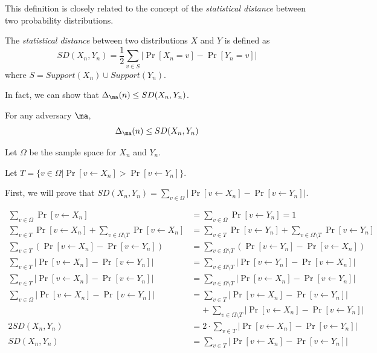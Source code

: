 This definition is closely related to the concept of the \textit{statistical distance} between two probability distributions.
\begin{definition}
The \emph{statistical distance} between two distributions $X$ and $Y$ is defined as
$$SD(X_n, Y_n) = \frac{1}{2}\sum\limits_{v \in S}|\Pr[X_n = v] - \Pr[Y_n = v]|$$
where $S = Support(X_n) \cup Support(Y_n)$.
\end{definition}
In fact, we can show that $\Delta_{\ma}(n) \le SD(X_n, Y_n)$.
\begin{lemma}
    For any adversary $\ma$,
    $$\Delta_{\ma}(n) \le SD(X_n, Y_n)$$
\end{lemma}

\proof
Let $\Omega$ be the sample space for $X_n$ and $Y_n$.

Let $T = \{v \in \Omega | \Pr[v \leftarrow X_n] > \Pr[v \leftarrow Y_n]\}$.

First, we will prove that $SD(X_n, Y_n) = \sum\limits_{v \in \Omega} |\Pr[v \leftarrow X_n] - \Pr[v \leftarrow Y_n]|$.

\begin{align*}
    \sum\limits_{v \in \Omega} \Pr[v \leftarrow X_n] &= \sum\limits_{v \in \Omega} \Pr[v \leftarrow Y_n] = 1 \\
    \sum\limits_{v \in T}\Pr[v \leftarrow X_n] + \sum\limits_{v \in \Omega\setminus T}\Pr[v \leftarrow X_n] &= \sum\limits_{v \in T}\Pr[v \leftarrow Y_n] + \sum\limits_{v \in \Omega\setminus T}\Pr[v \leftarrow Y_n]\\
    \sum\limits_{v \in T}(\Pr[v \leftarrow X_n] - \Pr[v \leftarrow Y_n]) &= \sum\limits_{v \in \Omega \setminus T}(\Pr[v \leftarrow Y_n] - \Pr[v \leftarrow X_n])\\
    \sum\limits_{v \in T}|\Pr[v \leftarrow X_n] - \Pr[v \leftarrow Y_n]| &= \sum\limits_{v \in \Omega \setminus T}|\Pr[v \leftarrow Y_n] - \Pr[v \leftarrow X_n]|\\
    \sum\limits_{v \in T}|\Pr[v \leftarrow X_n] - \Pr[v \leftarrow Y_n]| &= \sum\limits_{v \in \Omega \setminus T}|\Pr[v \leftarrow X_n] - \Pr[v \leftarrow Y_n]|\\
    \sum\limits_{v \in \Omega}|\Pr[v \leftarrow X_n] - \Pr[v \leftarrow Y_n]| &= \sum\limits_{v \in T}|\Pr[v \leftarrow X_n] - \Pr[v \leftarrow Y_n]|\\
    &\;\;\;\; + \sum\limits_{v \in \Omega \setminus T}|\Pr[v \leftarrow X_n] - \Pr[v \leftarrow Y_n]|\\
    2SD(X_n, Y_n) &= 2 \cdot \sum\limits_{v \in T}|\Pr[v \leftarrow X_n] - \Pr[v \leftarrow Y_n]|\\
    SD(X_n, Y_n) &= \sum\limits_{v \in T}|\Pr[v \leftarrow X_n] - \Pr[v \leftarrow Y_n]|
\end{align*}

